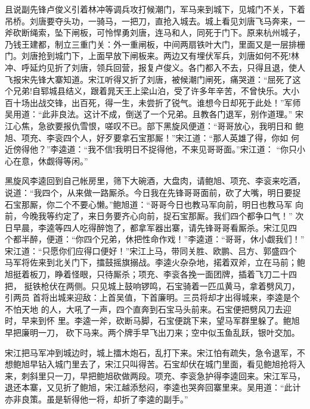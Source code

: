 且说副先锋卢俊义引着林冲等调兵攻打候潮门，军马来到城下，见城门不关，下着
吊桥。刘唐要夺头功，一骑马，一把刀，直抢入城去。城上看见刘唐飞马奔来，一
斧砍断绳索，坠下闸板，可怜悍勇刘唐，连马和人，同死于门下。原来杭州城子，
乃钱王建都，制立三重门关：外一重闸板，中间两扇铁叶大门，里面又是一层排栅
门。刘唐抢到城门下，上面早放下闸板来。两边又有埋伏军兵，刘唐如何不死!林
冲、呼延灼见折了刘唐，领兵回营，报复卢俊义。各门都入不去，只得且退，使人
飞报宋先锋大寨知道。宋江听得又折了刘唐，被候潮门闸死，痛哭道：“屈死了这
个兄弟!自郓城县结义，跟着晁天王上梁山泊，受了许多年辛苦，不曾快乐。大小
百十场出战交锋，出百死，得一生，未尝折了锐气。谁想今日却死于此处！”军师
吴用道：“此非良法。这计不成，倒送了一个兄弟。且教各门退军，别作道理。”
宋江心焦，急欲要报仇雪恨，嗟叹不已。部下黑旋风便道：“哥哥放心，我明日和
鲍旭、项充、李衮四个人，好歹要拿石宝那厮！”宋江道：“那人英雄了得，你如
何近傍得他？”李逵道：“我不信!我明日不捉得他，不来见哥哥面。”宋江道：
“你只小心在意，休觑得等闲。”

黑旋风李逵回到自己帐房里，筛下大碗酒，大盘肉，请鲍旭、项充、李衮来吃酒，
说道：“我四个，从来做一路厮杀。今日我在先锋哥哥面前，砍了大嘴，明日要捉
石宝那厮，你二个不要心懒。”鲍旭道：“哥哥今日也教马军向前，明日也教马军
向前，今晚我等约定了，来日务要齐心向前，捉石宝那厮。我们四个都争口气！”
次日早晨，李逵等四人吃得醉饱了，都拿军器出寨，请先锋哥哥看厮杀。宋江见四
个都半醉，便道：“你四个兄弟，休把性命作戏！”李逵道：“哥哥，休小觑我们！”
宋江道：“只愿你们应得口便好！”宋江上马，带同关胜、欧鹏、吕方、郭盛四个
马军将佐来到北关门下，擂鼓摇旗搦战。李逵火杂杂地，掿着双斧，立在马前；鲍
旭挺着板刀，睁着怪眼，只待厮杀；项充、李衮各挽一面团牌，插着飞刀二十四把，
挺铁枪伏在两侧。只见城上鼓响锣鸣，石宝骑着一匹瓜黄马，拿着劈风刀，引两员
首将出城来迎敌：上首吴值，下首廉明。三员将却才出得城来，李逵是个不怕天地
的人，大吼了一声，四个直奔到石宝马头前来。石宝便把劈风刀去迎时，早来到怀
里。李逵一斧，砍断马脚，石宝便跳下来，望马军群里躲了。鲍旭早把廉明一刀，
砍下马来。两个牌手早飞出刀来；空中似玉鱼乱跃，银叶交加。

宋江把马军冲到城边时，城上擂木炮石，乱打下来。宋江怕有疏失，急令退军，不
想鲍旭早钻入城门里去了，宋江只叫得苦。石宝却伏在城门里面，看见鲍旭抢将入
来，刺斜里只一刀，早把鲍旭砍做两段。项充、李衮急护得李逵回来。宋江军马，
退还本寨，又见折了鲍旭，宋江越添愁闷，李逵也哭奔回寨里来。吴用道：“此计
亦非良策。虽是斩得他一将，却折了李逵的副手。”

